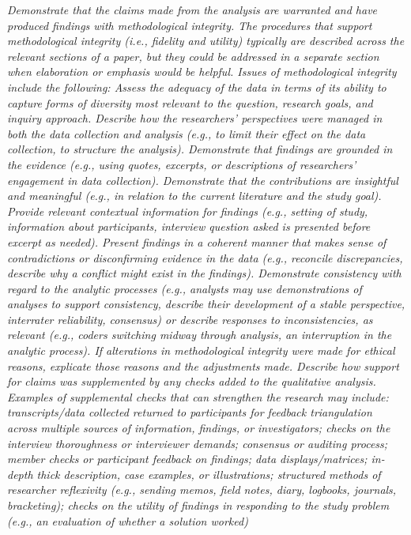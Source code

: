 \documentclass[acmsmall]{acmart}
\begin{document}
{\em\small Demonstrate that the claims made from the analysis are warranted and have produced findings with methodological integrity. The procedures that support methodological integrity (i.e., fidelity and utility) typically are described across the relevant sections of a paper, but they could be addressed in a separate section when elaboration or emphasis would be helpful. Issues of methodological integrity include the following: Assess the adequacy of the data in terms of its ability to capture forms of diversity most relevant to the question, research goals, and inquiry approach. Describe how the researchers’ perspectives were managed in both the data collection and analysis (e.g., to limit their effect on the data collection, to structure the analysis). Demonstrate that findings are grounded in the evidence (e.g., using quotes, excerpts, or descriptions of researchers’ engagement in data collection). Demonstrate that the contributions are insightful and meaningful (e.g., in relation to the current literature and the study goal). Provide relevant contextual information for findings (e.g., setting of study, information about participants, interview question asked is presented before excerpt as needed). Present findings in a coherent manner that makes sense of contradictions or disconfirming evidence in the data (e.g., reconcile discrepancies, describe why a conflict might exist in the findings). Demonstrate consistency with regard to the analytic processes (e.g., analysts may use demonstrations of analyses to support consistency, describe their development of a stable perspective, interrater reliability, consensus) or describe responses to inconsistencies, as relevant (e.g., coders switching midway through analysis, an interruption in the analytic process). If alterations in methodological integrity were made for ethical reasons, explicate those reasons and the adjustments made. Describe how support for claims was supplemented by any checks added to the qualitative analysis. Examples of supplemental checks that can strengthen the research may include: transcripts/data collected returned to participants for feedback triangulation across multiple sources of information, findings, or investigators; checks on the interview thoroughness or interviewer demands; consensus or auditing process; member checks or participant feedback on findings; data displays/matrices; in-depth thick description, case examples, or illustrations; structured methods of researcher reflexivity (e.g., sending memos, field notes, diary, logbooks, journals, bracketing); checks on the utility of findings in responding to the study problem (e.g., an evaluation of whether a solution worked) }
\end{document}
